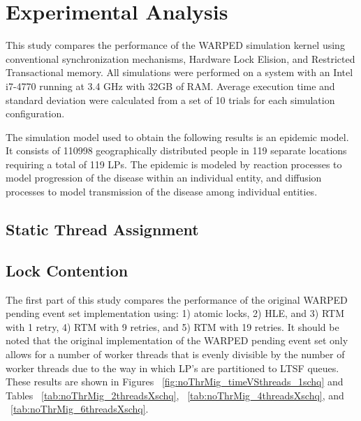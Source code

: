 \documentclass[a4paper]{article}
\begin{document}
\newpage
\section{\textbf{Experimental Analysis}}

This study compares the performance of the WARPED simulation kernel
using conventional synchronization mechanisms, Hardware Lock Elision, and
Restricted Transactional memory.  All simulations were performed on a system
with an Intel i7-4770 running at 3.4 GHz with 32GB of RAM.  Average execution
time and standard deviation were calculated from a set of 10 trials for each
simulation configuration.
\par

The simulation model used to obtain the following results is an epidemic
model.  It consists of 110998 geographically distributed people in 119 separate
locations requiring a total of 119 LPs.  The epidemic is modeled by reaction processes
to model progression of the disease within an individual entity, and diffusion
processes to model transmission of the disease among individual entities.
\par

\subsection{\textbf{Static Thread Assignment}}






\subsection{\textbf{Lock Contention}}

The first part of this study compares the performance of the original WARPED
pending event set implementation using: 1) atomic locks, 2) HLE, and 3) RTM with
1 retry, 4) RTM with 9 retries, and 5) RTM with 19 retries.  It should be noted
that the original implementation of the WARPED pending event set only allows for
a number of worker threads that is evenly divisible by the number of worker
threads due to the way in which LP's are partitioned to LTSF queues.  These
results are shown in Figures ~\ref{fig:noThrMig_timeVSthreads_1schq} and Tables
~\ref{tab:noThrMig_2threadsXschq}, ~\ref{tab:noThrMig_4threadsXschq}, and
~\ref{tab:noThrMig_6threadsXschq}.\par
\end{document}
